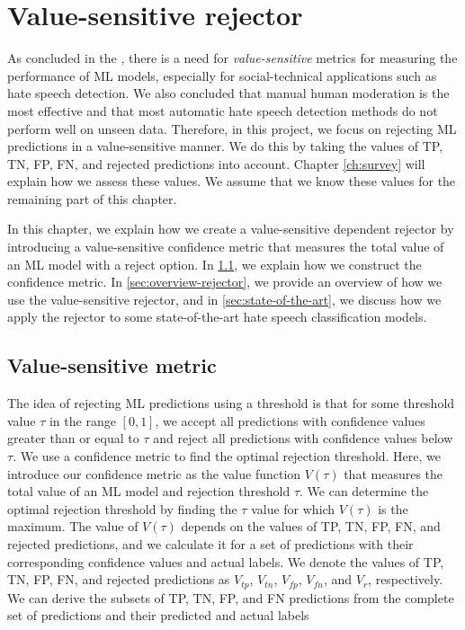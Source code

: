 \chapter{Value-sensitive rejector}
\label{ch:rejector}
As concluded in the , there is a need for \textit{value-sensitive} metrics for measuring the performance of ML models, especially for social-technical applications such as hate speech detection.
%
We also concluded that manual human moderation is the most effective and that most automatic hate speech detection methods do not perform well on unseen data.
%
Therefore, in this project, we focus on rejecting ML predictions in a value-sensitive manner.
%
We do this by taking the values of TP, TN, FP, FN, and rejected predictions into account.
%
%
Chapter \ref{ch:survey} will explain how we assess these values.
%
We assume that we know these values for the remaining part of this chapter.
%

%
In this chapter, we explain how we create a value-sensitive dependent rejector by introducing a value-sensitive confidence metric that measures the total value of an ML model with a reject option.
%
In \ref{sec:value-metric}, we explain how we construct the confidence metric.
%
In \ref{sec:overview-rejector}, we provide an overview of how we use the value-sensitive rejector, and in \ref{sec:state-of-the-art}, we discuss how we apply the rejector to some state-of-the-art hate speech classification models.

\section{Value-sensitive metric}
\label{sec:value-metric}
The idea of rejecting ML predictions using a threshold is that for some threshold value $\tau$ in the range $[0, 1]$, we accept all predictions with confidence values greater than or equal to $\tau$ and reject all predictions with confidence values below $\tau$.
%
We use a confidence metric to find the optimal rejection threshold.
%
Here, we introduce our confidence metric as the value function $V(\tau)$ that measures the total value of an ML model and rejection threshold $\tau$.
%
We can determine the optimal rejection threshold by finding the $\tau$ value for which $V(\tau)$ is the maximum.
%
The value of $V(\tau)$ depends on the values of TP, TN, FP, FN, and rejected predictions, and we calculate it for a set of predictions with their corresponding confidence values and actual labels.
%
We denote the values of TP, TN, FP, FN, and rejected predictions as $V_{tp}$, $V_{tn}$, $V_{fp}$, $V_{fn}$, and $V_r$, respectively.
%
We can derive the subsets of TP, TN, FP, and FN predictions from the complete set of predictions and their predicted and actual labels
%

